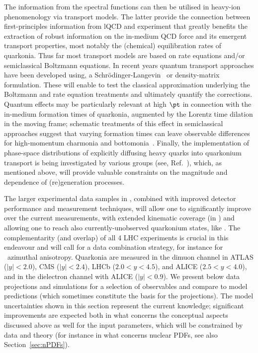 \documentclass[../report.tex]{subfiles}
\begin{document}
The information from the spectral functions can then be utilised in heavy-ion phenomenology via transport models. The latter provide the connection between first-principles information from lQCD and experiment that greatly benefits the extraction of robust information on the in-medium QCD force and its emergent transport properties, most notably the (chemical) equilibration rates of quarkonia. 
Thus far most transport models are based on rate equations and/or semiclassical Boltzmann equations. In recent years quantum transport approaches have been developed using, \eg a Schr\"odinger-Langevin~\cite{Blaizot:2015hya,Katz:2015qja,Kajimoto:2017rel} or density-matrix~\cite{Akamatsu:2014qsa,Brambilla:2016wgg} formulation. These will enable to test the classical approximation underlying the Boltzmann and rate equation treatments and ultimately quantify the corrections.  Quantum effects may be particularly relevant at high $\pt$ in connection with the in-medium formation times of quarkonia, augmented by the Lorentz time dilation in the moving frame; schematic treatments of this effect in semiclassical approaches suggest that varying formation times can leave observable differences for high-momentum charmonia and bottomonia~\cite{Song:2015bja,Hoelck:2016tqf,Du:2017qkv,Aronson:2017ymv,Krouppa:2017jlg}. 
Finally, the implementation of phase-space distributions of explicitly diffusing heavy quarks into quarkonium transport is being investigated by various groups (see, \eg Ref.~\cite{Yao:2017fuc}), which, as mentioned above, will provide valuable constraints on the magnitude and \pt dependence of (re)generation processes.     


The larger experimental data samples in \RunsThreeFour, combined with improved detector performance and measurement techniques, will allow one to significantly improve over the current measurements, with extended kinematic coverage (in \pT) and allowing one to reach also currently-unobserved quarkonium states, like 
.
The complementarity (and overlap) of all 4 LHC experiments is crucial in this endeavour and will call for a data combination strategy, for instance for \PGU\ azimuthal anisotropy.
Quarkonia are measured in the dimuon channel in ATLAS ($|y|<2.0$), CMS ($|y|<2.4$), LHCb ($2.0<y<4.5$), and ALICE ($2.5<y<4.0$), and in the dielectron channel with ALICE ($|y|<0.9$).
We present below data projections and simulations for a selection of observables and compare to model predictions (which sometimes constitute the basis for the projections). The model uncertainties shown in this section represent the current knowledge; significant improvements are expected both in what concerns the conceptual aspects discussed above as well for the input parameters, which will be constrained by data and theory (for instance in what concerns nuclear PDFs, see also Section~\ref{sec:nPDFs}).
\end{document}
